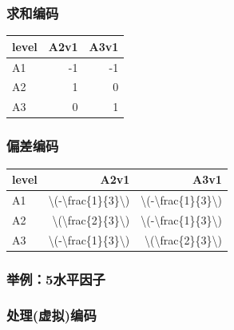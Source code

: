 \documentclass[
]{book}
\begin{document}
\hypertarget{ux6c42ux548cux7f16ux7801}{%
\subsubsection{求和编码}\label{ux6c42ux548cux7f16ux7801}}

\begin{table}
\centering
\begin{tabular}{l|r|r}
\hline
level & A2v1 & A3v1\\
\hline
A1 & -1 & -1\\
\hline
A2 & 1 & 0\\
\hline
A3 & 0 & 1\\
\hline
\end{tabular}
\end{table}

\hypertarget{ux504fux5deeux7f16ux7801}{%
\subsubsection{偏差编码}\label{ux504fux5deeux7f16ux7801}}

\begin{table}
\centering
\begin{tabular}{l|r|r}
\hline
level & A2v1 & A3v1\\
\hline
A1 & \textbackslash{}(-\textbackslash{}frac\{1\}\{3\}\textbackslash{}) & \textbackslash{}(-\textbackslash{}frac\{1\}\{3\}\textbackslash{})\\
\hline
A2 & \textbackslash{}(\textbackslash{}frac\{2\}\{3\}\textbackslash{}) & \textbackslash{}(-\textbackslash{}frac\{1\}\{3\}\textbackslash{})\\
\hline
A3 & \textbackslash{}(-\textbackslash{}frac\{1\}\{3\}\textbackslash{}) & \textbackslash{}(\textbackslash{}frac\{2\}\{3\}\textbackslash{})\\
\hline
\end{tabular}
\end{table}

\hypertarget{ux4e3eux4f8b5ux6c34ux5e73ux56e0ux5b50}{%
\subsubsection{举例：5水平因子}\label{ux4e3eux4f8b5ux6c34ux5e73ux56e0ux5b50}}

\hypertarget{ux5904ux7406ux865aux62dfux7f16ux7801-1}{%
\subsubsection{处理(虚拟)编码}\label{ux5904ux7406ux865aux62dfux7f16ux7801-1}}
\end{document}
